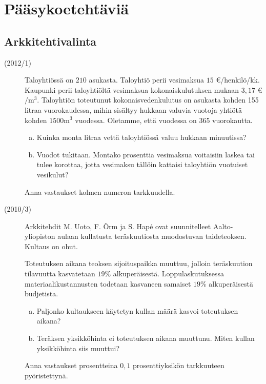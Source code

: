 \chapter{Pääsykoetehtäviä}

\section{Arkkitehtivalinta}

\begin{description}
    \item[(2012/1)] Taloyhtiössä on $210$ asukasta. Taloyhtiö perii vesimaksua
        $15$ \euro/henkilö/kk. Kaupunki perii taloyhtiöltä vesimaksua
        kokonaiskulutuksen mukaan $3,17$ \euro $/ \mathrm{m}^3$.
        Taloyhtiön toteutunut kokonaisvedenkulutus on asukasta kohden
        155 litraa vuorokaudessa, mihin sisältyy hukkaan valuvia
        vuotoja yhtiötä kohden $1500 \mathrm{m}^3$ vuodessa. Oletamme,
        että vuodessa on $365$ vuorokautta.
                    
    \begin{enumerate}[(a)]
        \item Kuinka monta litraa vettä taloyhtiössä valuu hukkaan minuutissa?
        \item Vuodot tukitaan. Montako prosenttia vesimaksua voitaisiin laskea
            tai tulee korottaa, jotta vesimaksu tällöin kattaisi taloyhtiön
            vuotuiset vesikulut?
    \end{enumerate}
    
    Anna vastaukset kolmen numeron tarkkuudella.
\end{description}


\begin{description}
    \item[(2010/3)] Arkkitehdit M. Uoto, F. Örm ja S. Hapé ovat suunnitelleet Aalto-yliopiston aulaan kullatusta teräskuutiosta muodostuvan taideteoksen. Kultaus on ohut.
    
    Toteutuksen aikana teoksen sijoituspaikka muuttuu, jolloin teräskuution tilavuutta kasvatetaan $19$\% alkuperäisestä. Loppulaskutuksessa materiaalikustannusten todetaan kasvaneen samaiset $19$\% alkuperäisestä budjetista.                   
    \begin{enumerate}[(a)]
        \item Paljonko kultaukseen käytetyn kullan määrä kasvoi toteutuksen aikana?
        \item Teräksen yksikköhinta ei toteutuksen aikana muuttunu. Miten kullan yksikköhinta siis muuttui?
    \end{enumerate}
    
    Anna vastaukset prosentteina $0,1$ prosenttiyksikön tarkkuuteen pyöristettynä.
\end{description}

